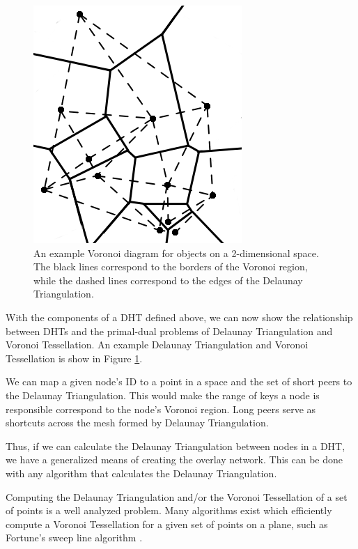\documentclass[11pt,conference]{IEEEtran}
\begin{document}
\begin{figure}
	\centering
	\includegraphics[width=0.75\linewidth]{voronoi}
	\caption{An example Voronoi diagram for objects on a 2-dimensional space.  The black lines correspond to the borders of the Voronoi region, while the dashed lines correspond to the edges of the Delaunay Triangulation.}
	\label{voro-ex}
\end{figure}


With the components of a DHT defined above, we can now show the relationship between DHTs and the primal-dual problems of Delaunay Triangulation and Voronoi Tessellation.
An example Delaunay Triangulation and Voronoi Tessellation is show in Figure \ref{voro-ex}.

We can map a given node's ID to a point in a space and the set of short peers to the Delaunay Triangulation.
This would make the range of keys a node is responsible correspond to the node's Voronoi region.
Long peers serve as shortcuts across the mesh formed by Delaunay Triangulation.


Thus, if we can calculate the Delaunay Triangulation between nodes in a DHT, we have a generalized means of creating the overlay network.
This can be done with any algorithm that calculates the Delaunay Triangulation.

Computing the Delaunay Triangulation and/or the Voronoi Tessellation of a set of points is a well analyzed problem.
Many algorithms exist which efficiently compute a Voronoi Tessellation for a given set of points on a plane, such as Fortune's sweep line algorithm \cite{fortune1987sweepline}.
\end{document}
